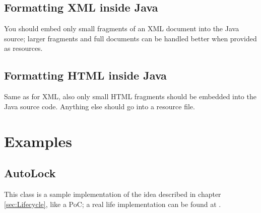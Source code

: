 \documentclass[12pt,a4paper,titlepage, parskip=half, headsepline, footsepline, cleardoubleplain]{scrbook}
\begin{document}
\subsection{Formatting XML inside Java}\label{sec:FormattingXMLInsideJava}
You should embed only small fragments of an XML document into the Java source; larger fragments and full documents can be handled better when provided as resources.

\subsection{Formatting HTML inside Java}\label{sec:FormattingHTMLInsideJava}
Same as for XML, also only small HTML fragments should be embedded into the Java source code. Anything else should go into a resource file.

\section{Examples}\label{sec:Examples}

\subsection{AutoLock}\label{sec:AutoLock}
This class is a sample implementation of the idea described in chapter \vref{sec:Lifecycle}, like a PoC; a real life implementation can be found at \autocite{TQUADRAT_ORG_FOUNDATION_AUTOLOCK}.
\end{document}

